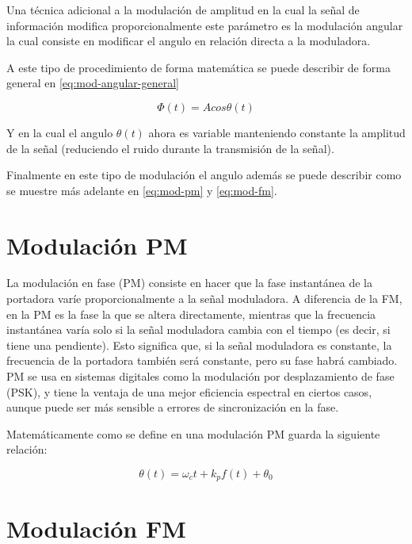 \documentclass[conference]{IEEEtran}
\begin{document}
	Una técnica adicional a la modulación de amplitud en la cual la señal de información modifica proporcionalmente este parámetro es la modulación angular la cual consiste en modificar el angulo en relación directa a la moduladora.
	
	A este tipo de procedimiento de forma matemática se puede describir de forma general en \ref{eq:mod-angular-general}
	
	\begin{equation}
		\Phi(t) = Acos\theta (t)
		\label{eq:mod-angular-general}
	\end{equation}
	
	Y en la cual el angulo $\theta(t)$ ahora es variable manteniendo constante la amplitud de la señal (reduciendo el ruido durante la transmisión de la señal).
	
	Finalmente en este tipo de modulación el angulo además se puede describir como se muestre más adelante en \ref{eq:mod-pm} y \ref{eq:mod-fm}.
	
	
	\section{ Modulación PM}
	
	La modulación en fase (PM) consiste en hacer que la fase instantánea de la portadora varíe proporcionalmente a la señal moduladora. A diferencia de la FM, en la PM es la fase la que se altera directamente, mientras que la frecuencia instantánea varía solo si la señal moduladora cambia con el tiempo (es decir, si tiene una pendiente). Esto significa que, si la señal moduladora es constante, la frecuencia de la portadora también será constante, pero su fase habrá cambiado. PM se usa en sistemas digitales como la modulación por desplazamiento de fase (PSK), y tiene la ventaja de una mejor eficiencia espectral en ciertos casos, aunque puede ser más sensible a errores de sincronización en la fase.
	
	Matemáticamente como se define en \cite{stremler2006} una modulación PM guarda la siguiente relación:
	
	\begin{equation}
		\theta(t) = \omega_c t + k_p f(t) + \theta_0
		\label{eq:mod-pm}
	\end{equation}
	
	
	
	\section{ Modulación FM}
	
\end{document}

